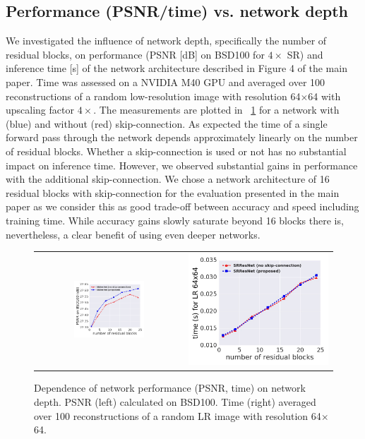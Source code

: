 \documentclass[10pt,twocolumn,letterpaper]{article}
\begin{document}
\subsection{Performance (PSNR/time) vs. network depth}
\label{app:performance}
We investigated the influence of network depth, specifically the number of residual blocks, on performance (PSNR [dB] on BSD100 for $4\times$ SR) and inference time [s] of the network architecture described in Figure 4 of the main paper. Time was assessed on a NVIDIA M40 GPU and averaged over 100 reconstructions of a random low-resolution image with resolution 64$\times$64 with upscaling factor $4\times$. The measurements are plotted in \figurename~\ref{fig:app_psnrtime} for a network with (blue) and without (red) skip-connection.
As expected the time of a single forward pass through the network depends approximately linearly on the number of residual blocks. Whether a skip-connection is used or not has no substantial impact on inference time. However, we observed substantial gains in performance with the additional skip-connection. We chose a network architecture of 16 residual blocks with skip-connection for the evaluation presented in the main paper as we consider this as good trade-off between accuracy and speed including training time. While accuracy gains slowly saturate beyond 16 blocks there is, nevertheless, a clear benefit of using even deeper networks.

\begin{figure}[ht!] 
  	\begin{tabular}{cc}
     	\includegraphics[width=0.5\textwidth]{images/used/appendix/jpg/psnr_vs_depth} & 
     	     	\includegraphics[width=0.5 \textwidth]{images/used/appendix/jpg/time_vs_depth}\\
  	\end{tabular}
  		\caption{Dependence of network performance (PSNR, time) on network depth. PSNR (left) calculated on BSD100. Time (right) averaged over 100 reconstructions of a random LR image with resolution 64$\times$64.} 
	\label{fig:app_psnrtime}
\end{figure}
\end{document}
